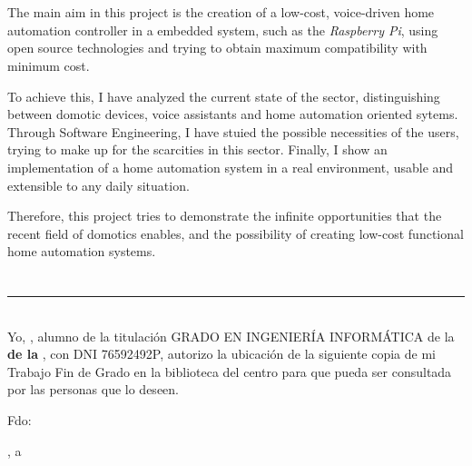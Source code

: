 \\

\vspace{0.7cm}
\\

The main aim in this project is the creation of a low-cost, voice-driven home automation controller in a embedded system, such 
as the \textit{Raspberry Pi}, using open source technologies and trying to obtain maximum compatibility with minimum cost.

\bigskip
To achieve this, I have analyzed the current state of the sector, distinguishing between domotic devices, voice assistants
and home automation oriented sytems. Through Software Engineering, I have stuied the possible necessities of the users, trying
to make up for the scarcities in this sector. Finally, I show an implementation of a home automation system in a real environment,
usable and extensible to any daily situation.

\bigskip
Therefore, this project tries to demonstrate the infinite opportunities that the recent field of domotics enables, and the possibility
of creating low-cost functional home automation systems. 

\chapter*{}
\thispagestyle{empty}

\noindent\rule[-1ex]{\textwidth}{2pt}\\[4.5ex]

Yo, \textbf{\myName}, alumno de la titulación GRADO EN INGENIERÍA INFORMÁTICA de la \textbf{\myFaculty de la \myUni}, 
con DNI 76592492P, autorizo la ubicación de la siguiente copia de mi Trabajo Fin de Grado en la biblioteca del centro 
para que pueda ser consultada por las personas que lo deseen.

\vspace{6cm}

\noindent Fdo: \myName

\vspace{2cm}

\begin{flushright}
\myLocation, a \myTimeES
\end{flushright}


\chapter*{}
\thispagestyle{empty}

